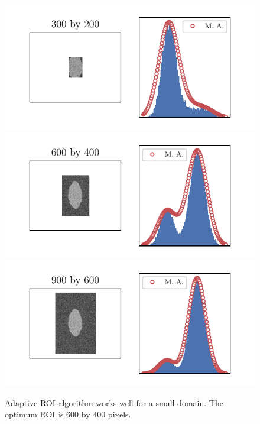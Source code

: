 \documentclass[12pt, twoside, a4paper]{article}
\begin{document}
\begin{figure}[!htbp]
	\centering
	\includegraphics[scale=1.0]{figures/08_ModalAnalysisSmallDomain/ModalAnalysis_xROI = 300 yROI = 200.pdf} \\
	\includegraphics[scale=1.0]{figures/08_ModalAnalysisSmallDomain/ModalAnalysis_xROI = 600 yROI = 400.pdf} \\
	\includegraphics[scale=1.0]{figures/08_ModalAnalysisSmallDomain/ModalAnalysis_xROI = 900 yROI = 600.pdf} 
	\caption{Adaptive ROI algorithm works well for a small domain. The optimum ROI is 600 by 400 pixels.
	}
	\label{openCV adaptive ROI small domain}
\end{figure}
%
\end{document}
